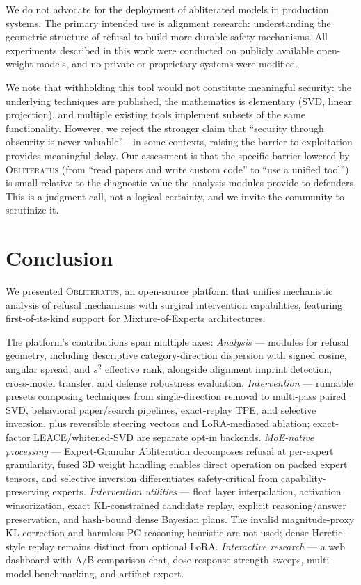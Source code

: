 \documentclass[11pt]{article}
\begin{document}
We do not advocate for the deployment of abliterated models in production systems. The primary intended use is alignment research: understanding the geometric structure of refusal to build more durable safety mechanisms. All experiments described in this work were conducted on publicly available open-weight models, and no private or proprietary systems were modified.

We note that withholding this tool would not constitute meaningful security: the underlying techniques are published, the mathematics is elementary (SVD, linear projection), and multiple existing tools implement subsets of the same functionality. However, we reject the stronger claim that ``security through obscurity is never valuable''---in some contexts, raising the barrier to exploitation provides meaningful delay. Our assessment is that the specific barrier lowered by \textsc{Obliteratus} (from ``read papers and write custom code'' to ``use a unified tool'') is small relative to the diagnostic value the analysis modules provide to defenders. This is a judgment call, not a logical certainty, and we invite the community to scrutinize it.

\section{Conclusion}

We presented \textsc{Obliteratus}, an open-source platform that unifies mechanistic analysis of refusal mechanisms with surgical intervention capabilities, featuring first-of-its-kind support for Mixture-of-Experts architectures.

The platform's contributions span multiple axes:
\emph{Analysis} --- modules for refusal geometry, including descriptive category-direction dispersion with signed cosine, angular spread, and $s^2$ effective rank, alongside alignment imprint detection, cross-model transfer, and defense robustness evaluation.
\emph{Intervention} --- runnable presets composing techniques from single-direction removal to multi-pass paired SVD, behavioral paper/search pipelines, exact-replay TPE, and selective inversion, plus reversible steering vectors and LoRA-mediated ablation; exact-factor LEACE/whitened-SVD are separate opt-in backends.
\emph{MoE-native processing} --- Expert-Granular Abliteration decomposes refusal at per-expert granularity, fused 3D weight handling enables direct operation on packed expert tensors, and selective inversion differentiates safety-critical from capability-preserving experts.
\emph{Intervention utilities} --- float layer interpolation, activation winsorization, exact KL-constrained candidate replay, explicit reasoning/answer preservation, and hash-bound dense Bayesian plans. The invalid magnitude-proxy KL correction and harmless-PC reasoning heuristic are not used; dense Heretic-style replay remains distinct from optional LoRA.
\emph{Interactive research} --- a web dashboard with A/B comparison chat, dose-response strength sweeps, multi-model benchmarking, and artifact export.
\end{document}
